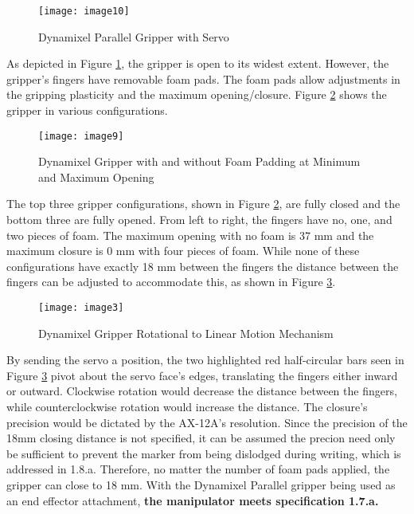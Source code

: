 \begin{figure}[htp]
  \centering
  \texttt{[image: image10]}
  \caption{Dynamixel Parallel Gripper with Servo \cite{gripper1}}
  \label{fig:gripper1}
\end{figure}

As depicted in Figure \ref{fig:gripper1}, the gripper is open to its widest extent. However, the gripper’s fingers have removable foam pads. The foam pads allow adjustments in the gripping plasticity and the maximum opening/closure. Figure \ref{fig:gripper2} shows the gripper in various configurations.
\newpage
\begin{figure}[ht]
  \centering
  \texttt{[image: image9]}
  \caption{Dynamixel Gripper with and without Foam Padding at Minimum and Maximum Opening \cite{gripper1}}
  \label{fig:gripper2}
\end{figure}

The top three gripper configurations, shown in Figure \ref{fig:gripper2}, are fully closed and the bottom three are fully opened. From left to right, the fingers have no, one, and two pieces of foam. The maximum opening with no foam is 37 mm and the maximum closure is 0 mm with four pieces of foam. While none of these configurations have exactly 18 mm between the fingers the distance between the fingers can be adjusted to accommodate this, as shown in Figure \ref{fig:gripper3}.

\begin{figure}[htp]
  \centering
  \texttt{[image: image3]}
  \caption{Dynamixel Gripper Rotational to Linear Motion Mechanism \cite{gripper2}}
  \label{fig:gripper3}
\end{figure}

By sending the servo a position, the two highlighted red half-circular bars seen in Figure \ref{fig:gripper3} pivot about the servo face’s edges, translating the fingers either inward or outward. Clockwise rotation would decrease the distance between the fingers, while counterclockwise rotation would increase the distance. The closure’s precision would be dictated by the AX-12A’s resolution. Since the precision of the 18mm closing distance is not specified, it can be assumed the precion need only be sufficient to prevent the marker from being dislodged during writing, which is addressed in 1.8.a. Therefore, no matter the number of foam pads applied, the gripper can close to 18 mm. With the Dynamixel Parallel gripper being used as an end effector attachment, \textbf{the manipulator meets specification 1.7.a.}


